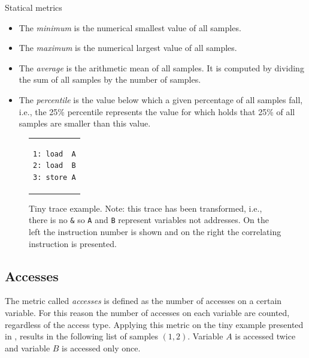 \documentclass[onecolumn, openright, master, english, signatures]{dbrgrptt}
\begin{document}
\begin{remark} Statical metrics\
\begin{itemize}
\item The \emph{minimum} is the numerical smallest value of all samples.
\item The \emph{maximum} is the numerical largest value of all samples.
\item The \emph{average} is the arithmetic mean of all samples. It is computed by dividing the sum of all samples by the number of samples.
\item The \emph{percentile} is the value below which a given percentage of all samples fall, i.e., the 25\% percentile represents the value for which holds that 25\% of all samples are smaller than this value.
\end{itemize}
\end{remark}

\begin{figure}[!ht]
  \centering
  \begin{tabular}{c}
  \begin{lstlisting}
1: load  A
2: load  B
3: store A
  \end{lstlisting}
  \end{tabular}
  \caption{Tiny \ac{trace} example. Note: this trace has been transformed, i.e., there is no \texttt{\&} so \texttt{A} and \texttt{B} represent variables not addresses. On the left the instruction number is shown and on the right the correlating instruction is presented.}
  \label{fig:metrics-exmaple}
\end{figure}

\subsection{Accesses}\label{ssec:metric-accesses}
The metric called \emph{accesses} is defined as the number of accesses on a certain variable.
For this reason the number of accesses on each variable are counted, regardless of the access type.
Applying this metric on the tiny example presented in \Cref{fig:metrics-exmaple}, results in the following list of samples $(1, 2)$.
Variable $A$ is accessed twice and variable $B$ is accessed only once.
\end{document}

